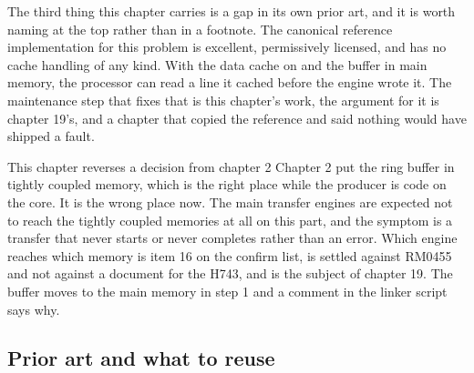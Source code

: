 The third thing this chapter carries is a gap in its own prior art, and it is
worth naming at the top rather than in a footnote. The canonical reference
implementation for this problem is excellent, permissively licensed, and has no
cache handling of any kind. With the data cache on and the buffer in main
memory, the processor can read a line it cached before the engine wrote it. The
maintenance step that fixes that is this chapter's work, the argument for it is
chapter 19's, and a chapter that copied the reference and said nothing would
have shipped a fault.

\begin{note}{This chapter reverses a decision from chapter 2}
Chapter 2 put the ring buffer in tightly coupled memory, which is the right
place while the producer is code on the core. It is the wrong place now. The
main transfer engines are expected not to reach the tightly coupled memories at
all on this part, and the symptom is a transfer that never starts or never
completes rather than an error. Which engine reaches which memory is item 16 on
the confirm list, is settled against RM0455 and not against a document for the
H743, and is the subject of chapter 19. The buffer moves to the main memory in
step 1 and a comment in the linker script says why.
\end{note}

\subsection*{Prior art and what to reuse}


